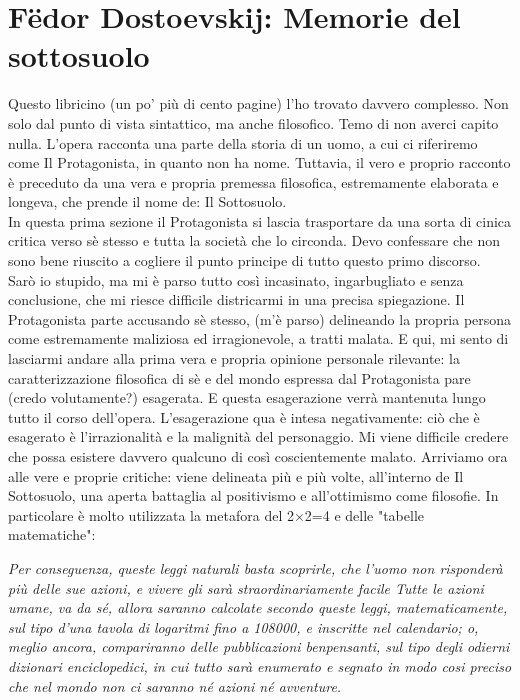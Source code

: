 \documentclass[12pt,a4paper]{report}
\theoremstyle{definition}
\theoremstyle{Theorem}
\theoremstyle{definition}
\theoremstyle{definition}
\theoremstyle{definition}
\begin{document}
\chapter{Fëdor Dostoevskij: Memorie del sottosuolo}
Questo libricino (un po' più di cento pagine) l'ho trovato davvero complesso. Non solo dal punto di vista sintattico, ma anche filosofico. Temo di non averci capito nulla. L'opera racconta una parte della storia di un uomo, a cui ci riferiremo come Il Protagonista, in quanto non ha nome. Tuttavia, il vero e proprio racconto è preceduto da una vera e propria premessa filosofica, estremamente elaborata e longeva, che prende il nome de: Il Sottosuolo.\\
In questa prima sezione il Protagonista si lascia trasportare da una sorta di cinica critica verso sè stesso e tutta la società che lo circonda. Devo confessare che non sono bene riuscito a cogliere il punto principe di tutto questo primo discorso. Sarò io stupido, ma mi è parso tutto così incasinato, ingarbugliato e senza conclusione, che mi riesce difficile districarmi in una precisa spiegazione. Il Protagonista parte accusando sè stesso, (m'è parso) delineando la propria persona come estremamente maliziosa ed irragionevole, a tratti malata. E qui, mi sento di lasciarmi andare alla prima vera e propria opinione personale rilevante: la caratterizzazione filosofica di sè e del mondo espressa dal Protagonista pare (credo volutamente?) esagerata. E questa esagerazione verrà mantenuta lungo tutto il corso dell'opera. L'esagerazione qua è intesa negativamente: ciò che è esagerato è l'irrazionalità e la malignità del personaggio. Mi viene difficile credere che possa esistere davvero qualcuno di così coscientemente  malato. Arriviamo ora alle vere e proprie critiche: viene delineata più e più volte, all'interno de Il Sottosuolo, una aperta battaglia al positivismo e all'ottimismo come filosofie. In particolare è molto utilizzata la metafora del 2$\times$2=4 e delle "tabelle matematiche":
\begin{center}
	\textit{Per conseguenza, queste leggi naturali basta scoprirle, che l'uomo non risponderà più delle sue azioni, e vivere gli sarà straordinariamente facile Tutte le azioni umane, va da sé, allora saranno calcolate secondo queste leggi, matematicamente, sul tipo d'una tavola di logaritmi fino a 108000, e inscritte nel calendario; o, meglio ancora, compariranno delle pubblicazioni benpensanti, sul tipo degli odierni dizionari enciclopedici, in cui tutto sarà enumerato e segnato in modo cosi preciso che nel mondo non ci saranno  né azioni né avventure.}
\end{center}
\end{document}
